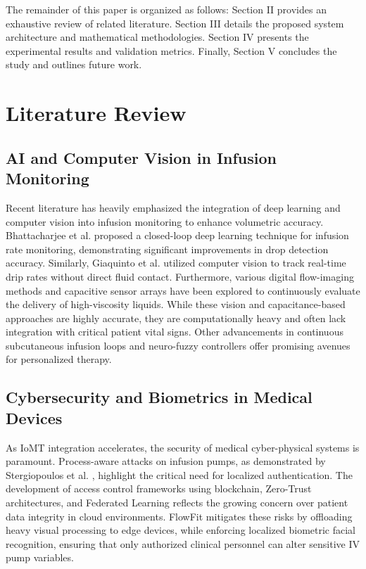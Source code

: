 \documentclass[journal]{IEEEtran}
\begin{document}
The remainder of this paper is organized as follows: Section II provides an exhaustive review of related literature. Section III details the proposed system architecture and mathematical methodologies. Section IV presents the experimental results and validation metrics. Finally, Section V concludes the study and outlines future work.

\section{Literature Review}

\subsection{AI and Computer Vision in Infusion Monitoring}
Recent literature has heavily emphasized the integration of deep learning and computer vision into infusion monitoring to enhance volumetric accuracy. Bhattacharjee et al. \cite{Bhattacharjee2025_1} proposed a closed-loop deep learning technique for infusion rate monitoring, demonstrating significant improvements in drop detection accuracy. Similarly, Giaquinto et al. \cite{Giaquinto2020_3} utilized computer vision to track real-time drip rates without direct fluid contact. Furthermore, various digital flow-imaging methods and capacitive sensor arrays have been explored to continuously evaluate the delivery of high-viscosity liquids. While these vision and capacitance-based approaches are highly accurate, they are computationally heavy and often lack integration with critical patient vital signs. Other advancements in continuous subcutaneous infusion loops and neuro-fuzzy controllers offer promising avenues for personalized therapy.

\subsection{Cybersecurity and Biometrics in Medical Devices}
As IoMT integration accelerates, the security of medical cyber-physical systems is paramount. Process-aware attacks on infusion pumps, as demonstrated by Stergiopoulos et al. \cite{Stergiopoulos2023_6}, highlight the critical need for localized authentication. The development of access control frameworks using blockchain, Zero-Trust architectures, and Federated Learning reflects the growing concern over patient data integrity in cloud environments\cite{Egala2023_31}. FlowFit mitigates these risks by offloading heavy visual processing to edge devices, while enforcing localized biometric facial recognition, ensuring that only authorized clinical personnel can alter sensitive IV pump variables.
\end{document}
